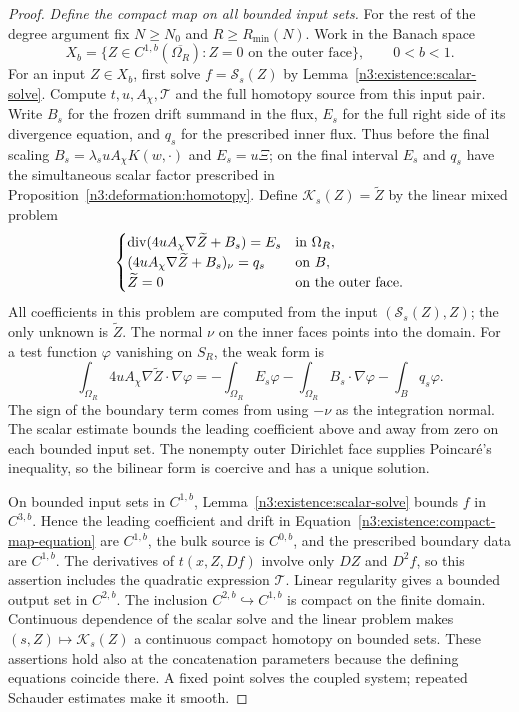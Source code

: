 \begin{proof}
\emph{Define the compact map on all bounded input sets.}
For the rest of the degree argument fix $N\ge N_0$ and
$R\ge R_{\min}(N)$. Work in the Banach space
\begin{equation}\label{n3:existence:banach-space}
 X_b=\{Z\in C^{1,b}(\overline{\Omega_R}):
                       Z=0\text{ on the outer face}\},
 \qquad 0<b<1.
\end{equation}
For an input $Z\in X_b$, first solve
$f=\mathcal S_s(Z)$ by Lemma~\ref{n3:existence:scalar-solve}.
Compute $t,u,A_\chi,\mathcal T$ and the full homotopy source
from this input pair.  Write $B_s$ for the frozen drift summand in
the flux, $E_s$ for the full right side of its divergence equation,
and $q_s$ for the prescribed inner flux.  Thus before the final
scaling $B_s=\lambda_suA_\chi K(w,\cdot)$ and $E_s=u\Xi$;
on the final interval $E_s$ and $q_s$ have the simultaneous scalar
factor prescribed in Proposition~\ref{n3:deformation:homotopy}.
Define $\mathcal K_s(Z)=\widetilde Z$ by the linear mixed problem
\begin{equation}\label{n3:existence:compact-map-equation}
 \begin{cases}
  \operatorname{div}(4uA_\chi\nabla\widetilde Z+B_s)=E_s
                           &\text{in }\Omega_R,\\
  (4uA_\chi\nabla\widetilde Z+B_s)_\nu=q_s
                           &\text{on }B,\\
  \widetilde Z=0           &\text{on the outer face}.
 \end{cases}
\end{equation}
All coefficients in this problem are computed from the input
$(\mathcal S_s(Z),Z)$; the only unknown is $\widetilde Z$.
The normal $\nu$ on the inner faces points into the domain.
For a test function $\varphi$ vanishing on $S_R$, the weak form is
\[
 \int_{\Omega_R}4uA_\chi\nabla\widetilde Z\cdot\nabla\varphi
 =-\int_{\Omega_R}E_s\varphi
  -\int_{\Omega_R}B_s\cdot\nabla\varphi
  -\int_B q_s\varphi.
\]
The sign of the boundary term comes from using $-\nu$ as the
integration normal. The scalar estimate bounds the leading
coefficient above and away from zero on each bounded input set.
The nonempty outer Dirichlet face supplies Poincar\'e's inequality,
so the bilinear form is coercive and has a unique solution.

On bounded input sets in $C^{1,b}$,
Lemma~\ref{n3:existence:scalar-solve} bounds $f$ in $C^{3,b}$.
Hence the leading coefficient and drift in
Equation~\eqref{n3:existence:compact-map-equation} are $C^{1,b}$,
the bulk source is $C^{0,b}$, and the prescribed boundary data are
$C^{1,b}$.  The derivatives of $t(x,Z,Df)$ involve only $DZ$
and $D^2f$, so this assertion includes the quadratic expression
$\mathcal T$.  Linear regularity gives a bounded output set in
$C^{2,b}$.  The inclusion $C^{2,b}\hookrightarrow C^{1,b}$ is
compact on the finite domain.  Continuous dependence of the scalar
solve and the linear problem makes $(s,Z)\mapsto\mathcal K_s(Z)$
a continuous compact homotopy on bounded sets.  These assertions
hold also at the concatenation parameters because the defining
equations coincide there.  A fixed point solves the coupled system;
repeated Schauder estimates make it smooth.


\end{proof}

